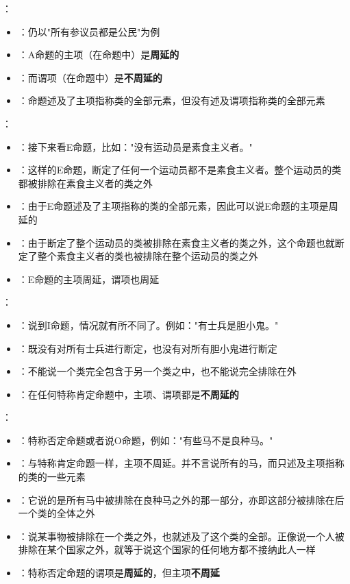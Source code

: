 \begin{examplebox}[title=各类命题的周延性分析]
：
\begin{itemize}
  \item {}：仍以"所有参议员都是公民"为例
  \item {}：A命题的主项（在命题中）是\textbf{周延的}
  \item {}：而谓项（在命题中）是\textbf{不周延的}
  \item {}：命题述及了主项指称类的全部元素，但没有述及谓项指称类的全部元素
\end{itemize}

：
\begin{itemize}
  \item {}：接下来看E命题，比如："没有运动员是素食主义者。"
  \item {}：这样的E命题，断定了任何一个运动员都不是素食主义者。整个运动员的类都被排除在素食主义者的类之外
  \item {}：由于E命题述及了主项指称的类的全部元素，因此可以说E命题的主项是周延的
  \item {}：由于断定了整个运动员的类被排除在素食主义者的类之外，这个命题也就断定了整个素食主义者的类也被排除在整个运动员的类之外
  \item {}：E命题的主项周延，谓项也周延
\end{itemize}

：
\begin{itemize}
  \item {}：说到I命题，情况就有所不同了。例如："有士兵是胆小鬼。"
  \item {}：既没有对所有士兵进行断定，也没有对所有胆小鬼进行断定
  \item {}：不能说一个类完全包含于另一个类之中，也不能说完全排除在外
  \item {}：在任何特称肯定命题中，主项、谓项都是\textbf{不周延的}
\end{itemize}

：
\begin{itemize}
  \item {}：特称否定命题或者说O命题，例如："有些马不是良种马。"
  \item {}：与特称肯定命题一样，主项不周延。并不言说所有的马，而只述及主项指称的类的一些元素
  \item {}：它说的是所有马中被排除在良种马之外的那一部分，亦即这部分被排除在后一个类的全体之外
  \item {}：说某事物被排除在一个类之外，也就述及了这个类的全部。正像说一个人被排除在某个国家之外，就等于说这个国家的任何地方都不接纳此人一样
  \item {}：特称否定命题的谓项是\textbf{周延的}，但主项\textbf{不周延}
\end{itemize}
\end{examplebox}


